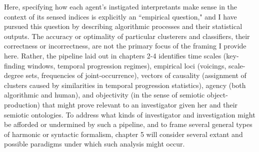 Here, specifying how each agent's instigated interpretants make sense in the context of its sensed indices is explicitly an ``empirical question," and I have pursued this question by describing algorithmic processes and their statistical outputs.  The accuracy or optimality of particular clusterers and classifiers, their correctness or incorrectness, are not the primary focus of the framing I provide here.  Rather, the pipeline laid out in chapters 2-4 identifies time scales (key-finding windows, temporal progression regimes), empirical loci (voicings, scale-degree sets, frequencies of joint-occurrence), vectors of causality (assignment of clusters caused by similarities in temporal progression statistics), agency (both algorithmic and human), and objectivity (in the sense of semiotic object-production) that might prove relevant to an investigator given her and their semiotic ontologies.  To address what kinds of investigator and investigation might be afforded or undermined by such a pipeline, and to frame several general types of harmonic or syntactic formalism, chapter 5 will consider several extant and possible paradigms under which such analysis might occur.